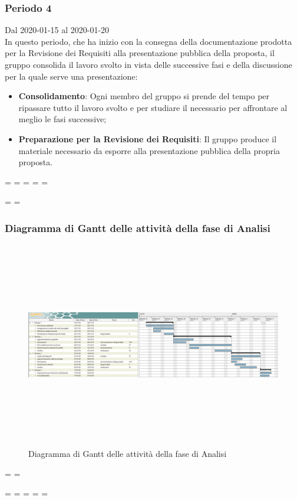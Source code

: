 \subsubsection{Periodo 4} 
Dal 2020-01-15 al 2020-01-20\\
In questo periodo, che ha inizio con la consegna della documentazione prodotta per la Revisione dei Requisiti alla presentazione pubblica della proposta, il gruppo consolida il lavoro svolto in vista delle successive fasi e della discussione per la quale serve una presentazione:
\begin{itemize}
	\item \textbf{Consolidamento}: Ogni membro del gruppo si prende del tempo per ripassare tutto il lavoro svolto e per studiare il necessario per affrontare al meglio le fasi successive;
	\item \textbf{Preparazione per la Revisione dei Requisiti}: Il gruppo produce il materiale necessario da esporre alla presentazione pubblica della propria proposta.
\end{itemize}

\newpage
\paperwidth=\pdfpageheight
\paperheight=\pdfpagewidth
\pdfpageheight=\paperheight
\pdfpagewidth=\paperwidth
\headwidth=\textheight

\begingroup 
\vsize=\textwidth
\hsize=\textheight

\subsubsection{Diagramma di Gantt delle attività della fase di Analisi}
\pagestyle{empty}
\begin{figure}[h]
	\centering	
	\includegraphics[height = 9cm, width = 24.5cm]{Sezioni/DiagrammiGantt/Analisi.png}
	\caption{Diagramma di Gantt delle attività della fase di Analisi}
\end{figure}

\textwidth=\hsize
\textheight=\vsize

\endgroup
\newpage
\paperwidth=\pdfpageheight
\paperheight=\pdfpagewidth
\pdfpageheight=\paperheight
\pdfpagewidth=\paperwidth
\headwidth=\textwidth